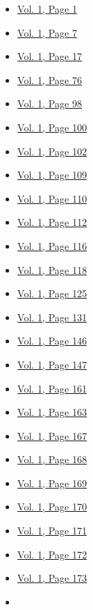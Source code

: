 \begin{itemize}
  \begin{itemize}
  \tightlist
  \item
    \protect\hyperlink{g-page-9}{Vol. 1, Page 1}
  \item
    \protect\hyperlink{g-page-15}{Vol. 1, Page 7}
  \item
    \protect\hyperlink{g-page-25}{Vol. 1, Page 17}
  \item
    \protect\hyperlink{g-page-84}{Vol. 1, Page 76}
  \item
    \protect\hyperlink{g-page-106}{Vol. 1, Page 98}
  \item
    \protect\hyperlink{g-page-108}{Vol. 1, Page 100}
  \item
    \protect\hyperlink{g-page-110}{Vol. 1, Page 102}
  \item
    \protect\hyperlink{g-page-117}{Vol. 1, Page 109}
  \item
    \protect\hyperlink{g-page-118}{Vol. 1, Page 110}
  \item
    \protect\hyperlink{g-page-120}{Vol. 1, Page 112}
  \item
    \protect\hyperlink{g-page-124}{Vol. 1, Page 116}
  \item
    \protect\hyperlink{g-page-126}{Vol. 1, Page 118}
  \item
    \protect\hyperlink{g-page-133}{Vol. 1, Page 125}
  \item
    \protect\hyperlink{g-page-139}{Vol. 1, Page 131}
  \item
    \protect\hyperlink{g-page-154}{Vol. 1, Page 146}
  \item
    \protect\hyperlink{g-page-155}{Vol. 1, Page 147}
  \item
    \protect\hyperlink{g-page-169}{Vol. 1, Page 161}
  \item
    \protect\hyperlink{g-page-171}{Vol. 1, Page 163}
  \item
    \protect\hyperlink{g-page-175}{Vol. 1, Page 167}
  \item
    \protect\hyperlink{g-page-176}{Vol. 1, Page 168}
  \item
    \protect\hyperlink{g-page-177}{Vol. 1, Page 169}
  \item
    \protect\hyperlink{g-page-178}{Vol. 1, Page 170}
  \item
    \protect\hyperlink{g-page-179}{Vol. 1, Page 171}
  \item
    \protect\hyperlink{g-page-180}{Vol. 1, Page 172}
  \item
    \protect\hyperlink{g-page-181}{Vol. 1, Page 173}
  \item

\end{itemize}
\end{itemize}
